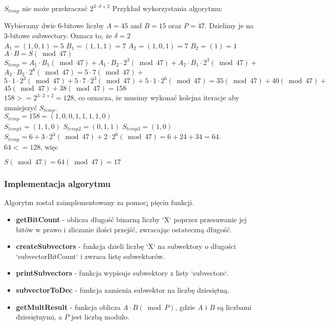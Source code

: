 \documentclass[11pt]{article}
\renewcommand\*{\cdot}
\begin{document}
$S_{temp}$ nie może przekraczać  $ 2^{3 \cdot \delta+2}$
\newpage
Przykład wykorzystania algorytmu:


Wybieramy dwie 6-bitowe liczby $A=45$ and $B=15$ oraz $P=47$. Dzielimy je na 3-bitowe subwectory. Oznacz to, że $\delta = 2$
\\
$A_1=\left(1, 0, 1\right) = 5$
$B_1=\left(1,1,1\right) = 7$
$A_2=\left(1, 0, 1\right) = 7$
$B_2=\left(1\right) = 1$
$A \cdot B=S(\bmod 47)$\\

$S_{temp} = A_1 \cdot B_1(\bmod 47)+A_1 \cdot B_2 \cdot 2^3(\bmod 47)+A_2 \cdot B_1 \cdot 2^3(\bmod 47)+$ $A_2 \cdot B_2 \cdot 2^6(\bmod 47) =5 \cdot 7(\bmod 47)+$ $5 \cdot 1 \cdot 2^3(\bmod 47)+5 \cdot 7 \cdot 2^3(\bmod 47)+5 \cdot 1 \cdot 2^6(\bmod 47)=35(\bmod 47)+40(\bmod 47)+$ $45(\bmod 47)+38(\bmod 47)=158$
\\


$158 >= 2^{3 \cdot 2+2} = 128$, co oznacza, że musimy wykonać kolejna iteracje aby zmniejszyć $S_{temp}$.
\\


$S_{temp} = 158 = \left(1,0,0,1,1,1,1,0\right)$
\\

$S_{temp1} = \left(1,1,0 \right)$
$S_{temp2} = \left(0,1,1 \right)$
$S_{temp3} = \left(1,0 \right)$
\\

$S_{temp} =6+3 \cdot 2^3(\bmod 47)+2 \cdot 2^6(\bmod 47)=6+24+34=64$.
\\

$64 <=  128$, więc

$S(\bmod 47) = 64(\bmod 47) = 17$


\subsubsection{Implementacja algorytmu}
Algorytm został zaimplementowany za pomoc¡ pięciu funkcji.
\begin{itemize}
    \item \textbf{getBitCount} - oblicza długość binarną liczby `X` poprzez przesuwanie jej bitów w prawo i zliczanie ilości przejść, zwracając ostateczną długość.
    \item \textbf{createSubvectors} - funkcja dzieli liczbę `X` na subwektory o długości `subvectorBitCount` i zwraca listę subwektorów.
    \item  \textbf{printSubvectors} - funkcja wypisuje subwektory z listy `subvectors`.
    \item \textbf{subvectorToDec} - funkcja zamienia subwektor na liczbę dziesiętną.
    \item   \textbf{getMultResult} - funkcja oblicza $A \cdot B(\bmod P)$, gdzie $A$ i $B$ są liczbami dziesiętnymi, a $P$ jest liczbą modulo.
\end{itemize}
\end{document}
